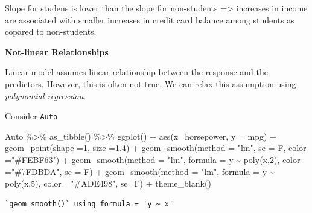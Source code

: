 \documentclass[
  letterpaper,
  DIV=11,
  numbers=noendperiod]{scrreprt}
\newenvironment{Shaded}{\begin{snugshade}}{\end{snugshade}}
\newcommand{\AttributeTok}[1]{\textcolor[rgb]{0.65,0.35,0.00}{#1}}
\newcommand{\DecValTok}[1]{\textcolor[rgb]{0.47,0.16,0.63}{#1}}
\newcommand{\FloatTok}[1]{\textcolor[rgb]{0.65,0.35,0.00}{#1}}
\newcommand{\FunctionTok}[1]{\textcolor[rgb]{0.02,0.16,0.49}{#1}}
\newcommand{\NormalTok}[1]{\textcolor[rgb]{0.33,0.33,0.33}{#1}}
\newcommand{\SpecialCharTok}[1]{\textcolor[rgb]{0.00,0.46,0.62}{#1}}
\newcommand{\StringTok}[1]{\textcolor[rgb]{0.00,0.50,0.00}{#1}}
\begin{document}
Slope for studens is lower than the slope for non-students
=\textgreater{} increases in income are associated with smaller
increases in credit card balance among students as copared to
non-students.

\textbf{Not-linear Relationships}

Linear model assumes linear relationship between the response and the
predictors. However, this is often not true. We can relax this
assumption using \emph{polynomial regression}.

Consider \texttt{Auto}

\begin{Shaded}
\begin{Highlighting}[]
\NormalTok{Auto }\SpecialCharTok{\%\textgreater{}\%} \FunctionTok{as\_tibble}\NormalTok{() }\SpecialCharTok{\%\textgreater{}\%} 
  \FunctionTok{ggplot}\NormalTok{() }\SpecialCharTok{+} \FunctionTok{aes}\NormalTok{(}\AttributeTok{x=}\NormalTok{horsepower, }\AttributeTok{y =}\NormalTok{ mpg) }\SpecialCharTok{+} \FunctionTok{geom\_point}\NormalTok{(}\AttributeTok{shape =}\DecValTok{1}\NormalTok{, }\AttributeTok{size =}\FloatTok{1.4}\NormalTok{) }\SpecialCharTok{+} 
  \FunctionTok{geom\_smooth}\NormalTok{(}\AttributeTok{method =} \StringTok{"lm"}\NormalTok{, }\AttributeTok{se =}\NormalTok{ F, }\AttributeTok{color =}\StringTok{"\#FEBF63"}\NormalTok{) }\SpecialCharTok{+}
  \FunctionTok{geom\_smooth}\NormalTok{(}\AttributeTok{method =} \StringTok{"lm"}\NormalTok{, }\AttributeTok{formula =}\NormalTok{ y }\SpecialCharTok{\textasciitilde{}} \FunctionTok{poly}\NormalTok{(x,}\DecValTok{2}\NormalTok{), }\AttributeTok{color =}\StringTok{"\#7FDBDA"}\NormalTok{, }\AttributeTok{se =}\NormalTok{ F) }\SpecialCharTok{+}
  \FunctionTok{geom\_smooth}\NormalTok{(}\AttributeTok{method =} \StringTok{"lm"}\NormalTok{, }\AttributeTok{formula =}\NormalTok{ y }\SpecialCharTok{\textasciitilde{}} \FunctionTok{poly}\NormalTok{(x,}\DecValTok{5}\NormalTok{), }\AttributeTok{color =}\StringTok{"\#ADE498"}\NormalTok{, }\AttributeTok{se=}\NormalTok{F) }\SpecialCharTok{+} \FunctionTok{theme\_blank}\NormalTok{() }
\end{Highlighting}
\end{Shaded}

\begin{verbatim}
`geom_smooth()` using formula = 'y ~ x'
\end{verbatim}
\end{document}
